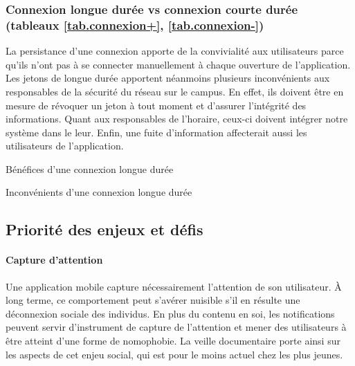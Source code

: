 		\subsubsection[Connexion longue durée vs connexion courte durée]{Connexion longue durée vs connexion courte durée (tableaux \ref{tab.connexion+}, \ref{tab.connexion-})}
		La persistance d'une connexion apporte de la convivialité aux utilisateurs parce qu'ils n'ont pas à se connecter manuellement à chaque ouverture de l'application. Les jetons de longue durée apportent néanmoins plusieurs inconvénients aux responsables de la sécurité du réseau sur le campus. En effet, ils doivent être en mesure de révoquer un jeton à tout moment et d'assurer l'intégrité des informations. Quant aux responsables de l'horaire, ceux-ci doivent intégrer notre système dans le leur. Enfin, une fuite d'information affecterait aussi les utilisateurs de l'application. 
	
		\begin{sidewaystable}[p]
			\centering
			\caption{Bénéfices d'une connexion longue durée}
			\label{tab.connexion+}
			
		\bigskip\bigskip
			\centering
			\caption{Inconvénients d'une connexion longue durée}
			\label{tab.connexion-}
			
		\end{sidewaystable}
		
	\subsection{Priorité des enjeux et défis}
	
	\paragraph{Capture d'attention} Une application mobile capture nécessairement l'attention de son utilisateur. À long terme, ce comportement peut s'avérer nuisible s'il en résulte une déconnexion sociale des individus. En plus du contenu en soi, les notifications peuvent servir d'instrument de capture de l'attention et mener des utilisateurs à être atteint d'une forme de nomophobie. La veille documentaire porte ainsi sur les aspects de cet enjeu social, qui est pour le moins actuel chez les plus jeunes.
	
